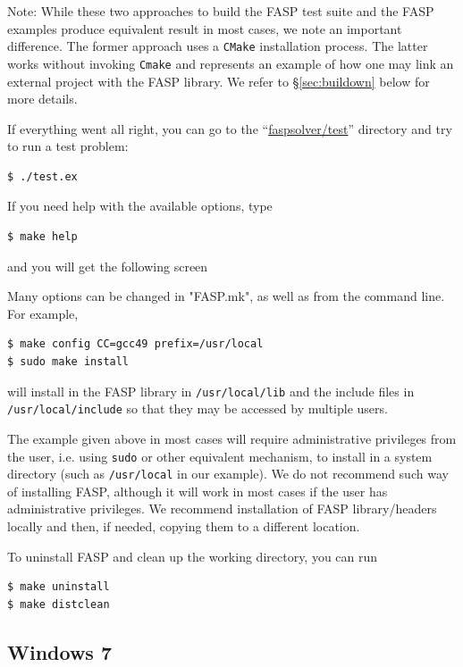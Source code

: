 \documentclass[11pt]{memoir}
\begin{document}
\begin{snugshade}
  \noindent
  Note: While these two approaches to build the FASP test suite and the
  FASP examples
  produce equivalent result in most cases, we note an important
  difference. The former approach uses a
  \verb|CMake| installation process. The latter works without invoking
  \verb|Cmake| and represents an example of how one may link
  an external project with the FASP library. We refer to
  \S\ref{sec:buildown} below for more details. 
\end{snugshade}

If everything went all right, you can go to the
``\url{faspsolver/test}'' directory and try to run a test problem:
%
\begin{lstlisting}[numbers=none]
$ ./test.ex
\end{lstlisting}
%
If you need help with the available options, type 
%
\begin{lstlisting}[numbers=none]
$ make help
\end{lstlisting}
%
and you will get the following screen


Many options can be changed in "FASP.mk", as well as from the command
line. For example,
\begin{lstlisting}[numbers=none]
$ make config CC=gcc49 prefix=/usr/local
$ sudo make install
\end{lstlisting}
will install in the FASP library in \verb|/usr/local/lib| and the
include files in \verb|/usr/local/include| so that they may be
accessed by multiple users.

\begin{snugshade}\noindent
  The example given above in most cases will require administrative
  privileges from the user, i.e. using \verb|sudo| or other equivalent
  mechanism, to install in a system directory (such as
  \verb|/usr/local| in our example). We do not recommend such way of
  installing FASP, although it will work in most cases if the user has
  administrative privileges.  We recommend installation of FASP
  library/headers locally and then, if needed, copying them to a
  different location.
\end{snugshade}

To uninstall FASP and clean up the working directory, you can run
%
\begin{lstlisting}[numbers=none]
$ make uninstall
$ make distclean
\end{lstlisting}
%

\subsection{Windows 7}
\end{document}
